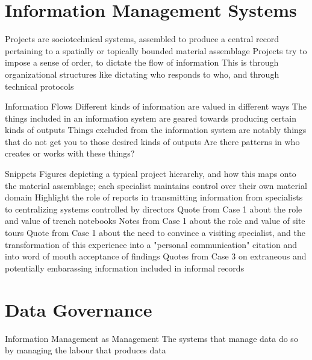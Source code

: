 \documentclass{beamer}
\begin{document}
\section{Information Management Systems}

\begin{frame}
  Projects are sociotechnical systems, assembled to produce a central record pertaining to a spatially or topically bounded material assemblage
  Projects try to impose a sense of order, to dictate the flow of information
  This is through organizational structures like dictating who responds to who, and through technical protocols

\end{frame}

\begin{frame}{Information Flows}
  Different kinds of information are valued in different ways
  The things included in an information system are geared towards producing certain kinds of outputs
  Things excluded from the information system are notably things that do not get you to those desired kinds of outputs
  Are there patterns in who creates or works with these things?
  
\end{frame}

\begin{frame}{Snippets}
  Figures depicting a typical project hierarchy, and how this maps onto the material assemblage; each specialist maintains control over their own material domain
  Highlight the role of reports in transmitting information from specialists to centralizing systems controlled by directors
  Quote from Case 1 about the role and value of trench notebooks
  Notes from Case 1 about the role and value of site tours
  Quote from Case 1 about the need to convince a visiting specialist, and the transformation of this experience into a "personal communication" citation and into word of mouth acceptance of findings
  Quotes from Case 3 on extraneous and potentially embarassing information included in informal records
  

\end{frame}


\section{Data Governance}

\begin{frame}{Information Management as Management}
  The systems that manage data do so by managing the labour that produces data

\end{frame}
\end{document}
